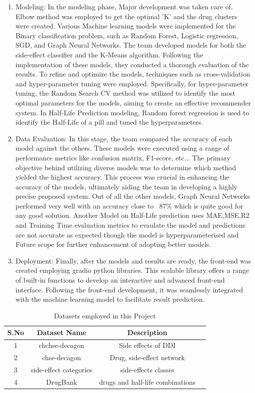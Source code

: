 \documentclass[journal,transmag]{J-NaNA}
\begin{document}
\begin{enumerate}
    \item Modeling: In the modeling phase, Major development was taken care of. Elbow method was employed to get the optimal 'K' and the drug clusters were created. Various Machine learning models were implemented for the Binary classification problem, such as Random Forest, Logistic regression, SGD, and Graph Neural Networks. The team developed models for both the side-effect classifier and the K-Means algorithm. Following the implementation of these models, they conducted a thorough evaluation of the results. To refine and optimize the models, techniques such as cross-validation and hyper-parameter tuning were employed. Specifically, for hyper-parameter tuning, the Random Search CV method was utilized to identify the most optimal parameters for the models, aiming to create an effective recommender system. In Half-Life Prediction modeling, Random forest regression is used to identify the Half-Life of a pill and tuned the hyperparameters.
    \item Data Evaluation: In this stage, the team compared the accuracy of each model against the others. These models were executed using a range of performance metrics like confusion matrix, F1-score, etc... The primary objective behind utilizing diverse models was to determine which method yielded the highest accuracy. This process was crucial in enhancing the accuracy of the models, ultimately aiding the team in developing a highly precise proposed system. Out of all the other models, Graph Neural Networks performed very well with an accuracy close to ~87\% which is quite good for any good solution. Another Model on Half-Life prediction uses MAE,MSE,R2 and Training Time evaluation metrics to evaulate the model and predictions are not accurate as expected though the model is hyperparameterised and Future scope for further enhancement of adopting better models.
    \item Deployment: Finally, after the models and results are ready, the front-end was created employing gradio python libraries. This scalable library offers a range of built-in functions to develop an interactive and advanced front-end interface. Following the front-end development, it was seamlessly integrated with the machine learning model to facilitate result prediction.
\end{enumerate}

\begin{table}[htbp]
\centering
\caption{Datasets employed in this Project}
\label{tab:Datasets description}
\begin{tabular}{|c|c|c|c|}
\hline
S.No & Dataset Name & Description \\ \hline
1 & chchse-decagon & Side effects of DDI \\ \hline
2 & chse-decagon & Drug, side-effect network \\ \hline
3 & side-effect categories & side-effects classes \\ \hline
4 & DrugBank & drugs and half-life combinations \\ \hline
\end{tabular}
\end{table}
\end{document}
